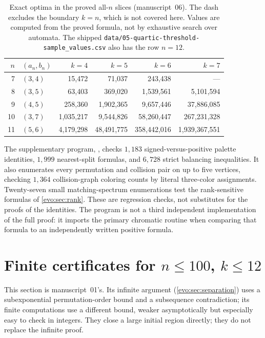 \documentclass[11pt,a4paper]{article}
\numberwithin{equation}{section}
\theoremstyle{definition}
\theoremstyle{remark}
\begin{document}
\begin{table}[htbp]
\centering
\small
\begin{tabular}{@{}rlrrrr@{}}
\toprule
$n$ & $(a_n,b_n)$ & $k=4$ & $k=5$ & $k=6$ & $k=7$\\
\midrule
7 & $(3,4)$ & 15,472 & 71,037 & 243,438 & ---\\
8 & $(3,5)$ & 63,403 & 369,020 & 1,539,561 & 5,101,594\\
9 & $(4,5)$ & 258,360 & 1,902,365 & 9,657,446 & 37,886,085\\
10 & $(3,7)$ & 1,035,217 & 9,544,826 & 58,260,447 & 267,231,328\\
11 & $(5,6)$ & 4,179,298 & 48,491,775 & 358,442,016 & 1,939,367,551\\
\bottomrule
\end{tabular}
\caption{Exact optima in the proved all-$n$ slices (manuscript~06). The dash
excludes the boundary $k=n$, which is not covered here. Values are computed
from the proved formula, not by exhaustive search over automata. The shipped
\texttt{data/05-quartic-threshold-sample\_values.csv} also has the row
$n=12$.}
\label{evo:tab:smallvalues}
\end{table}

The supplementary program, ,
checks $1{,}183$ signed-versus-positive palette identities, $1{,}999$
nearest-split formulas, and $6{,}728$ strict balancing inequalities. It also
enumerates every permutation and collision pair on up to five vertices,
checking $1{,}364$ collision-graph coloring counts by literal three-color
assignments. Twenty-seven small matching-spectrum enumerations test the
rank-sensitive formulas of \cref{evo:sec:rank}. These are regression checks,
not substitutes for the proofs of the identities. The program is not a third
independent implementation of the full proof: it imports the primary
chromatic routine when comparing that formula to an independently written
positive formula.

\section{Finite certificates for \texorpdfstring{$n\le100$, $k\le12$}{n <= 100, k <= 12}}\label{evo:sec:certificates}

This section is manuscript~01's. Its infinite argument
(\cref{evo:sec:separation}) uses a subexponential permutation-order bound and
a subsequence contradiction; its finite computations use a different bound,
weaker asymptotically but especially easy to check in integers. They close a
large initial region directly; they do not replace the infinite proof.
\end{document}

